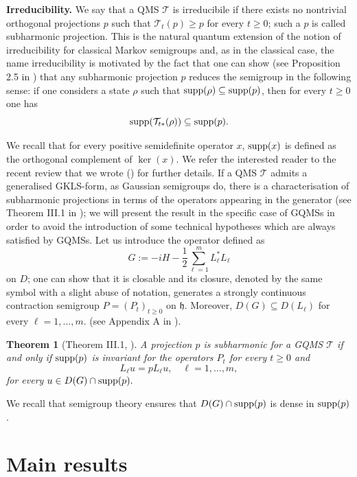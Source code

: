 \documentclass[preprint]{elsarticle}
\newtheorem{theo}[defi]{Theorem}
\theoremstyle{definition}
\def\hh{\mathfrak{h} }
\def\TT{\mathcal{T}}
\def\hh{\mathfrak{h}}
\begin{document}
\bigskip \textbf{Irreducibility.} We say that a QMS $\TT$ is irreducibile if there exists no nontrivial orthogonal projections $p$ such that
$\TT_t(p) \geq p$ for every $t \geq 0$; such a $p$ is called subharmonic projection. This is the natural quantum extension of the notion of irreducibility for classical Markov semigroups and, as in the classical case, the name irreducibility is motivated by the fact that one can show (see Proposition 2.5 in \cite{FG25}) that any subharmonic projection $p$ reduces the semigroup in the following sense: if one considers a state $\rho$ such that ${\rm supp}(\rho)\subseteq {\rm supp}(p)$, then for every $t \geq 0$ one has
$${\rm supp}(\TT_{t*}(\rho))\subseteq {\rm supp}(p).$$

We recall that for every positive semidefinite operator $x$, ${\rm supp}(x)$ is defined as the orthogonal complement of $\ker(x)$. We refer the interested reader to the recent review that we wrote (\cite{FG25}) for further details. If a QMS $\TT$ admits a generalised GKLS-form, as Gaussian semigroups do, there is a characterisation of subharmonic projections in terms of the operators appearing in the generator (see Theorem III.1 in \cite{FR02}); we will present the result in the specific case of GQMSs in order to avoid the introduction of some technical hypotheses which are always satisfied by GQMSs. Let us introduce the operator defined as
\begin{equation} \label{eq:G}
G:=-iH-\frac{1}{2}\sum_{\ell=1}^{m}L_\ell^*L_\ell\end{equation}
on $D$; one can show that it is closable and its closure, denoted by the same symbol with a slight abuse of notation, generates a strongly continuous contraction semigroup $P=(P_t)_{t \geq 0}$ on $\hh$. Moreover, $D(G) \subseteq D(L_\ell)$ for every $\ell=1,\dots, m$. (see Appendix A in \cite{AFP22}). 

\begin{theo}[Theorem III.1, \cite{FR02}] \label{theo:subharmonic}
A projection $p$ is subharmonic for a GQMS $\TT$ if and only if ${\rm supp}(p)$ is invariant for the operators $P_t$ for every $t \geq 0$ and
$$L_\ell u =pL_\ell u, \quad \ell=1,\dots, m,$$
for every $u \in D(G)\cap {\rm supp}(p).$
\end{theo}

We recall that semigroup theory ensures that $D(G)\cap {\rm supp}(p)$ is dense in ${\rm supp}(p)$.

\section{Main results} \label{sec:main}
\end{document}
